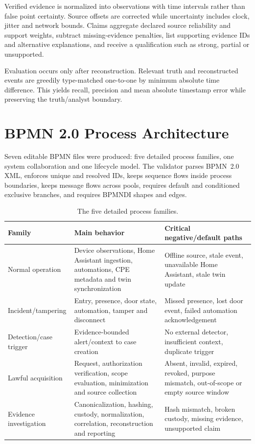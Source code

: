 ﻿\documentclass[11pt,a4paper]{article}
\begin{document}
Verified evidence is normalized into observations with time intervals rather than false point certainty. Source offsets are corrected while uncertainty includes clock, jitter and network bounds. Claims aggregate declared source reliability and support weights, subtract missing-evidence penalties, list supporting evidence IDs and alternative explanations, and receive a qualification such as strong, partial or unsupported.

Evaluation occurs only after reconstruction. Relevant truth and reconstructed events are greedily type-matched one-to-one by minimum absolute time difference. This yields recall, precision and mean absolute timestamp error while preserving the truth/analyst boundary.

\section{BPMN 2.0 Process Architecture}

Seven editable BPMN files were produced: five detailed process families, one system collaboration and one lifecycle model. The validator parses BPMN~2.0 XML, enforces unique and resolved IDs, keeps sequence flows inside process boundaries, keeps message flows across pools, requires default and conditioned exclusive branches, and requires BPMNDI shapes and edges.

\begin{table}[H]
\centering
\caption{The five detailed process families.}
\begin{tabularx}{\textwidth}{@{}l X X@{}}
\toprule
Family & Main behavior & Critical negative/default paths \\
\midrule
Normal operation & Device observations, Home Assistant ingestion, automations, CPE metadata and twin synchronization & Offline source, stale event, unavailable Home Assistant, stale twin update \\
Incident/tampering & Entry, presence, door state, automation, tamper and disconnect & Missed presence, lost door event, failed automation acknowledgement \\
Detection/case trigger & Evidence-bounded alert/context to case creation & No external detector, insufficient context, duplicate trigger \\
Lawful acquisition & Request, authorization verification, scope evaluation, minimization and source collection & Absent, invalid, expired, revoked, purpose mismatch, out-of-scope or empty source window \\
Evidence investigation & Canonicalization, hashing, custody, normalization, correlation, reconstruction and reporting & Hash mismatch, broken custody, missing evidence, unsupported claim \\
\bottomrule
\end{tabularx}
\end{table}
\end{document}
